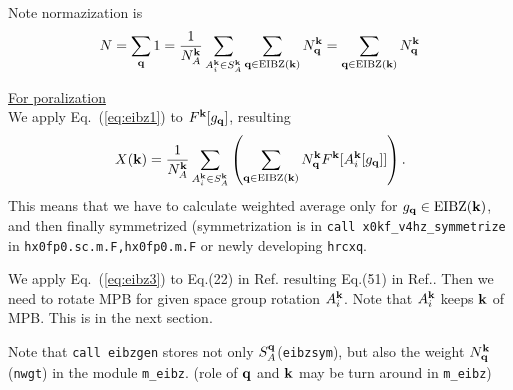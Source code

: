 \documentclass[a4paper,10pt,fleqn]{article}
\newcommand{\bfq}{{\bf q}}
\newcommand{\bfk}{{\bf k}}
\newcommand{\req}[1]{\mbox{Eq.~(\ref{#1})}}
\begin{document}
Note normazization is
\begin{eqnarray}
N=\sum_\bfq 1 = 
\frac{1}{N_A^\bfk} \sum_{A^\bfk_i \in S_A^\bfk } 
\sum_{\bfq \in {\rm EIBZ}(\bfk)}N_\bfq^\bfk =
\sum_{\bfq \in {\rm EIBZ}(\bfk)}N_\bfq^\bfk  \label{eq:eibz2}
\end{eqnarray}


\noindent \underline{For poralization}\\
We apply \req{eq:eibz1} to $F^\bfk[g_\bfq]$, resulting
\begin{eqnarray}
X(\bfk)
=\frac{1}{N_A^\bfk} \sum_{A^\bfk_i \in S_A^\bfk } \left( 
\sum_{\bfq \in {\rm EIBZ}(\bfk)}N_\bfq^\bfk F^\bfk[A^\bfk_i[g_\bfq]] \right).
\label{eq:eibz3} 
\end{eqnarray} 
This means that we have to calculate weighted average only for 
$g_\bfq \in {\rm EIBZ}(\bfk)$, and then finally symmetrized (symmetrization is in 
\verb#call x0kf_v4hz_symmetrize# 
in \verb#hx0fp0.sc.m.F,hx0fp0.m.F# or newly developing \verb#hrcxq#.

We apply \req{eq:eibz3} to Eq.(22) in Ref.\cite{friedrich_efficient_2010}
resulting Eq.(51) in Ref.\cite{friedrich_efficient_2010}.
Then we need to rotate MPB for given space group rotation $A^\bfk_i$. 
Note that $A^\bfk_i$ keeps $\bfk$ of MPB. This is in the next section. 

Note that \verb#call eibzgen# stores not only $S_A^\bfq$(\verb#eibzsym#), 
but also the weight $N_\bfq^\bfk$ (\verb#nwgt#) in the module \verb#m_eibz#.
(role of $\bfq$ and $\bfk$ may be turn around in \verb#m_eibz#)
\end{document}

